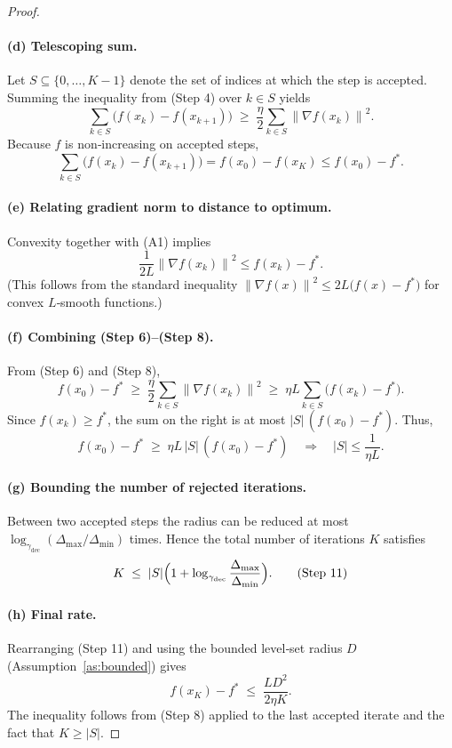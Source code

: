 \documentclass{article}
\newcommand{\norm}[1]{\left\lVert#1\right\rVert}
\begin{document}
\begin{proof}
\paragraph{(d) Telescoping sum.}
Let $S\subseteq\{0,\dots,K-1\}$ denote the set of indices at which the step is accepted.
Summing the inequality from (Step 4) over $k\in S$ yields
\[
\sum_{k\in S}\bigl(f(x_{k})-f(x_{k+1})\bigr)
\;\ge\; \frac{\eta}{2}\sum_{k\in S}\norm{\nabla f(x_{k})}^{2}. \tag{Step 6}
\]
Because $f$ is non‑increasing on accepted steps,
\[
\sum_{k\in S}\bigl(f(x_{k})-f(x_{k+1})\bigr)
= f(x_{0})-f(x_{K})\le f(x_{0})-f^{*}. \tag{Step 7}
\]

\paragraph{(e) Relating gradient norm to distance to optimum.}
Convexity together with (A1) implies
\[
\frac{1}{2L}\norm{\nabla f(x_{k})}^{2}\le f(x_{k})-f^{*}. \tag{Step 8}
\]
(This follows from the standard inequality $\norm{\nabla f(x)}^{2}\le 2L\bigl(f(x)-f^{*}\bigr)$ for convex $L$‑smooth functions.)

\paragraph{(f) Combining (Step 6)–(Step 8).}
From (Step 6) and (Step 8),
\[
f(x_{0})-f^{*}\;\ge\; \frac{\eta}{2}\sum_{k\in S}\norm{\nabla f(x_{k})}^{2}
\;\ge\; \eta L\sum_{k\in S}\bigl(f(x_{k})-f^{*}\bigr). \tag{Step 9}
\]
Since $f(x_{k})\ge f^{*}$, the sum on the right is at most $|S|\,(f(x_{0})-f^{*})$.
Thus,
\[
f(x_{0})-f^{*}\;\ge\;\eta L\,|S|\,(f(x_{0})-f^{*})\quad\Longrightarrow\quad
|S|\le\frac{1}{\eta L}. \tag{Step 10}
\]

\paragraph{(g) Bounding the number of rejected iterations.}
Between two accepted steps the radius can be reduced at most
$\log_{\gamma_{\text{dec}}}(\Delta_{\max}/\Delta_{\min})$ times.
Hence the total number of iterations $K$ satisfies
\[
K\;\le\;|S|\Bigl(1+\log_{\gamma_{\text{dec}}}\frac{\Delta_{\max}}{\Delta_{\min}}\Bigr). \tag{Step 11}
\]

\paragraph{(h) Final rate.}
Rearranging (Step 11) and using the bounded level‑set radius $D$ (Assumption~\ref{as:bounded}) gives
\[
f(x_{K})-f^{*}\;\le\;\frac{L D^{2}}{2\eta K}. \tag{Step 12}
\]
The inequality follows from (Step 8) applied to the last accepted iterate and the fact that $K\ge |S|$.
\end{proof}
\end{document}
